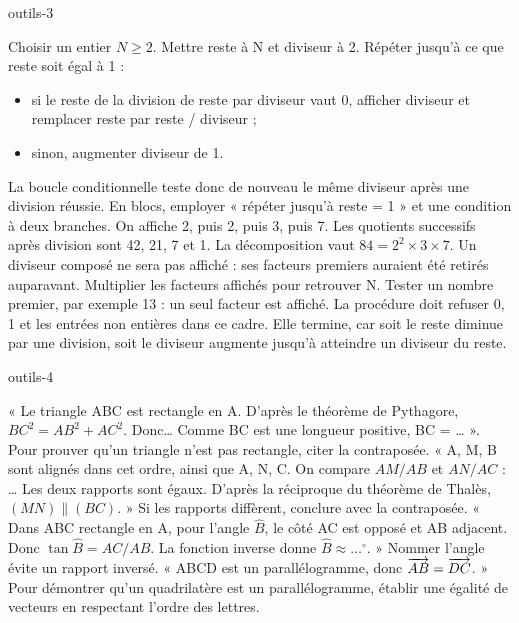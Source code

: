 \begin{blocEdition}{outils-3}

Choisir un entier $N\ge2$. Mettre reste à N et diviseur à 2.
Répéter jusqu’à ce que reste soit égal à 1 :\par
\begin{itemize}
\item si le reste de la division de reste par diviseur vaut 0, afficher
diviseur et remplacer reste par reste / diviseur ;
\item sinon, augmenter diviseur de 1.
\end{itemize}
La boucle conditionnelle teste donc de nouveau le même diviseur après une division réussie.
En blocs, employer « répéter jusqu’à reste = 1 » et une condition à deux branches.
On affiche 2, puis 2, puis 3, puis 7. Les quotients successifs après
division sont 42, 21, 7 et 1. La décomposition vaut
$84=2^2\times3\times7$. Un diviseur composé ne sera pas affiché :
ses facteurs premiers auraient été retirés auparavant.
Multiplier les facteurs affichés pour retrouver N.
Tester un nombre premier, par exemple 13 : un seul facteur est affiché.
La procédure doit refuser 0, 1 et les entrées non entières dans ce cadre.
Elle termine, car soit le reste diminue par une division, soit le diviseur
augmente jusqu’à atteindre un diviseur du reste.

\end{blocEdition}
\begin{blocEdition}{outils-4}

« Le triangle ABC est rectangle en A. D’après le théorème de Pythagore,
$BC^2=AB^2+AC^2$. Donc… Comme BC est une longueur positive, BC = … ».
Pour prouver qu’un triangle n’est pas rectangle, citer la contraposée.
« A, M, B sont alignés dans cet ordre, ainsi que A, N, C.
On compare $AM/AB$ et $AN/AC$ : … Les deux rapports sont égaux.
D’après la réciproque du théorème de Thalès, $(MN)\parallel(BC)$. »
Si les rapports diffèrent, conclure avec la contraposée.
« Dans ABC rectangle en A, pour l’angle $\widehat B$, le côté AC est opposé et
AB adjacent. Donc $\tan\widehat B=AC/AB$. La fonction inverse donne
$\widehat B\approx\ldots^\circ$. » Nommer l’angle évite un rapport inversé.
« ABCD est un parallélogramme, donc $\overrightarrow{AB}=\overrightarrow{DC}$. » Pour démontrer
qu’un quadrilatère est un parallélogramme, établir une égalité de vecteurs
en respectant l’ordre des lettres.

\end{blocEdition}
